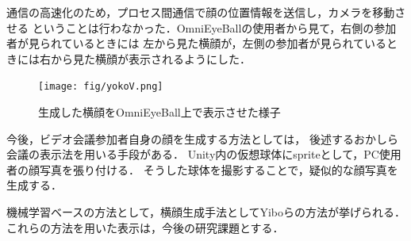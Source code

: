 通信の高速化のため，プロセス間通信で顔の位置情報を送信し，カメラを移動させる
ということは行わなかった．OmniEyeBallの使用者から見て，右側の参加者が見られているときには
左から見た横顔が，左側の参加者が見られているときには右から見た横顔が表示されるようにした．

\begin{figure}[tp]
  \centering
  \texttt{[image: fig/yokoV.png]}
  \caption{生成した横顔をOmniEyeBall上で表示させた様子}
\end{figure}

今後，ビデオ会議参加者自身の顔を生成する方法としては，
後述するおかしら会議\cite{10}の表示法を用いる手段がある．
Unity内の仮想球体にspriteとして，PC使用者の顔写真を張り付ける．
そうした球体を撮影することで，疑似的な顔写真を生成する．

機械学習ベースの方法として，横顔生成手法としてYiboら\cite{11}の方法が挙げられる．
これらの方法を用いた表示は，今後の研究課題とする．
